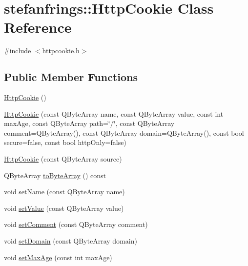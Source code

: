 \hypertarget{classstefanfrings_1_1_http_cookie}{}\section{stefanfrings\+:\+:Http\+Cookie Class Reference}
\label{classstefanfrings_1_1_http_cookie}


{\ttfamily \#include $<$httpcookie.\+h$>$}

\subsection*{Public Member Functions}
\begin{DoxyCompactItemize}
\item 
\mbox{\hyperlink{classstefanfrings_1_1_http_cookie_acd5da17724e0fdee1ea706214f744d32}{Http\+Cookie}} ()
\item 
\mbox{\hyperlink{classstefanfrings_1_1_http_cookie_af4dcaf6831807da172529127c1d3f28e}{Http\+Cookie}} (const Q\+Byte\+Array name, const Q\+Byte\+Array value, const int max\+Age, const Q\+Byte\+Array path=\char`\"{}/\char`\"{}, const Q\+Byte\+Array comment=Q\+Byte\+Array(), const Q\+Byte\+Array domain=Q\+Byte\+Array(), const bool secure=false, const bool http\+Only=false)
\item 
\mbox{\hyperlink{classstefanfrings_1_1_http_cookie_a07a3638faff8669808c9eb3267bc4d7c}{Http\+Cookie}} (const Q\+Byte\+Array source)
\item 
Q\+Byte\+Array \mbox{\hyperlink{classstefanfrings_1_1_http_cookie_aef937847dbebf7290e94b94afbb8f9a1}{to\+Byte\+Array}} () const
\item 
void \mbox{\hyperlink{classstefanfrings_1_1_http_cookie_a209cfdd43a29ded9a93ac6ad3e4f75ef}{set\+Name}} (const Q\+Byte\+Array name)
\item 
void \mbox{\hyperlink{classstefanfrings_1_1_http_cookie_a5b931091d1d667895a117e86b301d101}{set\+Value}} (const Q\+Byte\+Array value)
\item 
void \mbox{\hyperlink{classstefanfrings_1_1_http_cookie_a51b8f8e7fcb77f6f9d9750545cd2e98b}{set\+Comment}} (const Q\+Byte\+Array comment)
\item 
void \mbox{\hyperlink{classstefanfrings_1_1_http_cookie_a8ca88be725bee61644b546807f62ee7f}{set\+Domain}} (const Q\+Byte\+Array domain)
\item 
void \mbox{\hyperlink{classstefanfrings_1_1_http_cookie_ae17c01f48d8efbd553e954e0cb8a06b0}{set\+Max\+Age}} (const int max\+Age)
\item 

\end{DoxyCompactItemize}
